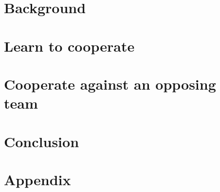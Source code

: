 \documentclass[twoside,openright,titlepage,numbers=noenddot,headinclude,%
               footinclude=true,cleardoublepage=empty,abstractoff,BCOR=5mm,%
               paper=a4,fontsize=11pt,english,dvipsnames]{scrreprt}
\numberwithin{theorem}{chapter}
\numberwithin{definition}{chapter}
\numberwithin{algorithm}{chapter}
\numberwithin{figure}{chapter}
\numberwithin{table}{chapter}
\numberwithin{equation}{chapter}
\begin{document}
\usetikzlibrary{positioning, shapes.geometric, arrows.meta, calc}


\frenchspacing
\raggedbottom
{}
\pagestyle{plain}



\cleardoublepage
\cleardoublepage
\cleardoublepage
\cleardoublepage
\pagestyle{scrheadings}
\cleardoublepage



\cleardoublepage

\cleardoublepage
\part{Background}\label{part:background}
\cleardoublepage
\part{Learn to cooperate}\label{part:coop}
\cleardoublepage
\cleardoublepage
\cleardoublepage
\part{Cooperate against an opposing team}\label{part:compet}
\cleardoublepage
\cleardoublepage
\part{Conclusion}\label{part:conclusion}
\cleardoublepage

\cleardoublepage
\makeatletter
\def\toclevel@chapter{-1}
\makeatother



\appendix
\part{Appendix}
\cleardoublepage
\cleardoublepage
\cleardoublepage
\end{document}
